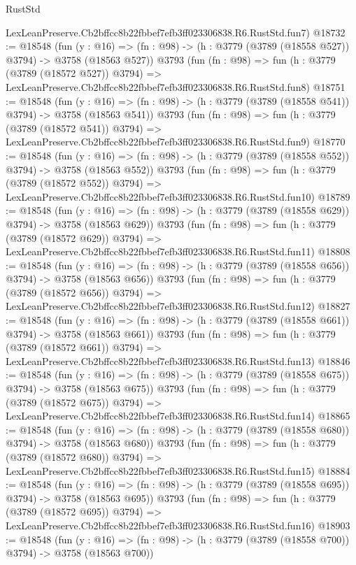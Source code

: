 \begin{lexlean}{RustStd}
\begin{coremodule}
    LexLeanPreserve.Cb2bffcc8b22fbbef7efb3ff023306838.R6.RustStd.fun7)
@18732 := @18548
    (fun (y : @16) => (fn : @98) -> (h : @3779 (@3789 (@18558 @527)) @3794) -> @3758 (@18563 @527))
    @3793
    (fun (fn : @98) =>
    fun (h : @3779 (@3789 (@18572 @527)) @3794) =>
    LexLeanPreserve.Cb2bffcc8b22fbbef7efb3ff023306838.R6.RustStd.fun8)
@18751 := @18548
    (fun (y : @16) => (fn : @98) -> (h : @3779 (@3789 (@18558 @541)) @3794) -> @3758 (@18563 @541))
    @3793
    (fun (fn : @98) =>
    fun (h : @3779 (@3789 (@18572 @541)) @3794) =>
    LexLeanPreserve.Cb2bffcc8b22fbbef7efb3ff023306838.R6.RustStd.fun9)
@18770 := @18548
    (fun (y : @16) => (fn : @98) -> (h : @3779 (@3789 (@18558 @552)) @3794) -> @3758 (@18563 @552))
    @3793
    (fun (fn : @98) =>
    fun (h : @3779 (@3789 (@18572 @552)) @3794) =>
    LexLeanPreserve.Cb2bffcc8b22fbbef7efb3ff023306838.R6.RustStd.fun10)
@18789 := @18548
    (fun (y : @16) => (fn : @98) -> (h : @3779 (@3789 (@18558 @629)) @3794) -> @3758 (@18563 @629))
    @3793
    (fun (fn : @98) =>
    fun (h : @3779 (@3789 (@18572 @629)) @3794) =>
    LexLeanPreserve.Cb2bffcc8b22fbbef7efb3ff023306838.R6.RustStd.fun11)
@18808 := @18548
    (fun (y : @16) => (fn : @98) -> (h : @3779 (@3789 (@18558 @656)) @3794) -> @3758 (@18563 @656))
    @3793
    (fun (fn : @98) =>
    fun (h : @3779 (@3789 (@18572 @656)) @3794) =>
    LexLeanPreserve.Cb2bffcc8b22fbbef7efb3ff023306838.R6.RustStd.fun12)
@18827 := @18548
    (fun (y : @16) => (fn : @98) -> (h : @3779 (@3789 (@18558 @661)) @3794) -> @3758 (@18563 @661))
    @3793
    (fun (fn : @98) =>
    fun (h : @3779 (@3789 (@18572 @661)) @3794) =>
    LexLeanPreserve.Cb2bffcc8b22fbbef7efb3ff023306838.R6.RustStd.fun13)
@18846 := @18548
    (fun (y : @16) => (fn : @98) -> (h : @3779 (@3789 (@18558 @675)) @3794) -> @3758 (@18563 @675))
    @3793
    (fun (fn : @98) =>
    fun (h : @3779 (@3789 (@18572 @675)) @3794) =>
    LexLeanPreserve.Cb2bffcc8b22fbbef7efb3ff023306838.R6.RustStd.fun14)
@18865 := @18548
    (fun (y : @16) => (fn : @98) -> (h : @3779 (@3789 (@18558 @680)) @3794) -> @3758 (@18563 @680))
    @3793
    (fun (fn : @98) =>
    fun (h : @3779 (@3789 (@18572 @680)) @3794) =>
    LexLeanPreserve.Cb2bffcc8b22fbbef7efb3ff023306838.R6.RustStd.fun15)
@18884 := @18548
    (fun (y : @16) => (fn : @98) -> (h : @3779 (@3789 (@18558 @695)) @3794) -> @3758 (@18563 @695))
    @3793
    (fun (fn : @98) =>
    fun (h : @3779 (@3789 (@18572 @695)) @3794) =>
    LexLeanPreserve.Cb2bffcc8b22fbbef7efb3ff023306838.R6.RustStd.fun16)
@18903 := @18548
    (fun (y : @16) => (fn : @98) -> (h : @3779 (@3789 (@18558 @700)) @3794) -> @3758 (@18563 @700))

\end{coremodule}
\end{lexlean}
